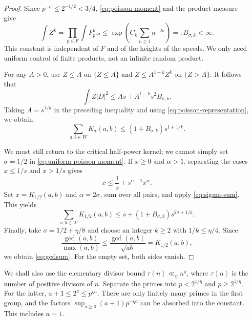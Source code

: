\documentclass[12pt,leqno]{article}
\numberwithin{equation}{section}
\theoremstyle{remark}
\begin{document}
\begin{proof}
Since $p^{-\sigma}\le2^{-1/2}<3/4$, \eqref{eq:poisson-moment} and the product measure give
\begin{equation}\label{eq:uniform-poisson-moment}
\int Z^k=\prod_{p\in F}\int P_{p^{-\sigma}}^k
\le\exp\left(C_k\sum_{n\ge1}n^{-2\sigma}\right)=:B_{\sigma,k}<\infty.
\end{equation}
This constant is independent of $F$ and of the heights of the speeds. We only need uniform control of finite products, not an infinite random product.

For any $A>0$, use $Z\le A$ on $\{Z\le A\}$ and $Z\le A^{1-k}Z^k$ on $\{Z>A\}$. It follows that
\[
\int Z|D|^2\le As+A^{1-k}s^2B_{\sigma,k}.
\]
Taking $A=s^{1/k}$ in the preceding inequality and using \eqref{eq:poisson-representation}, we obtain
\begin{equation}\label{eq:sigma-sum}
\sum_{a,b\in W}K_\sigma(a,b)\le(1+B_{\sigma,k})s^{1+1/k}.
\end{equation}

We must still return to the critical half-power kernel; we cannot simply set $\sigma=1/2$ in \eqref{eq:uniform-poisson-moment}. If $x\ge0$ and $\alpha>1$, separating the cases $x\le1/s$ and $x>1/s$ gives
\[
x\le\frac1s+s^{\alpha-1}x^\alpha.
\]
Set $x=K_{1/2}(a,b)$ and $\alpha=2\sigma$, sum over all pairs, and apply \eqref{eq:sigma-sum}. This yields
\[
\sum_{a,b\in W}K_{1/2}(a,b)
\le s+(1+B_{\sigma,k})s^{2\sigma+1/k}.
\]
Finally, take $\sigma=1/2+\eta/8$ and choose an integer $k\ge2$ with $1/k\le\eta/4$. Since
\[
\frac{\gcd(a,b)}{\max(a,b)}\le\frac{\gcd(a,b)}{\sqrt{ab}}=K_{1/2}(a,b),
\]
we obtain \eqref{eq:gcdsum}. For the empty set, both sides vanish.
\end{proof}

We shall also use the elementary divisor bound $\tau(n)\ll_\eta n^\eta$, where $\tau(n)$ is the number of positive divisors of $n$. Separate the primes into $p<2^{1/\eta}$ and $p\ge2^{1/\eta}$. For the latter, $a+1\le2^a\le p^{\eta a}$. There are only finitely many primes in the first group, and the factors $\sup_{a\ge0}(a+1)p^{-\eta a}$ can be absorbed into the constant. This includes $n=1$.
\end{document}
